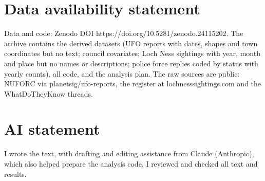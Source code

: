 \documentclass[11pt,a4paper]{article}
\begin{document}
\section*{Data availability statement}
Data and code: Zenodo DOI https://doi.org/10.5281/zenodo.24115202. The archive contains the derived datasets (UFO reports with dates, shapes and town coordinates but no text; council covariates; Loch Ness sightings with year, month and place but no names or descriptions; police force replies coded by status with yearly counts), all code, and the analysis plan. The raw sources are public: NUFORC via planetsig/ufo-reports, the register at lochnesssightings.com and the WhatDoTheyKnow threads.

\section*{AI statement}
I wrote the text, with drafting and editing assistance from Claude (Anthropic), which also helped prepare the analysis code. I reviewed and checked all text and results.
\end{document}
